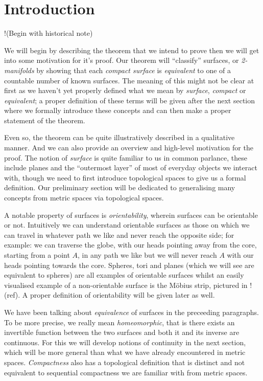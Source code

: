 \section{Introduction}
\label{sec:intro}

!(Begin with historical note)

We will begin by describing the theorem that we intend to prove then
we will get into some motivation for it's proof. Our theorem will
``classify'' surfaces, or \emph{2-manifolds} by showing that each
\emph{compact surface} is \emph{equivalent} to one of a countable
number of known surfaces. The meaning of this might not be clear at
first as we haven't yet properly defined what we mean by
\emph{surface}, \emph{compact} or \emph{equivalent}; a proper
definition of these terms will be given after the next section where we
formally introduce these concepts and can then make a proper statement
of the theorem. 

Even so, the theorem can be quite illustratively described in a
qualitative manner. And we can also provide an overview and high-level
motivation for the proof. The notion of \emph{surface} is quite
familiar to us in common parlance, these include planes and the
``outermost layer'' of most of everyday objects we interact with,
though we need to first introduce topological spaces to give us a
formal definition. Our preliminary section will be dedicated to
generalising many concepts from metric spaces via topological spaces.

A notable property of surfaces is
\emph{orientability}, wherein surfaces can be orientable or
not. Intuitively we can understand orientable surfaces as those on
which we can travel in whatever path we like and never reach the
opposite side; for example: we can traverse the globe, with our heads
pointing away from the core, starting from a point $A$, in any path we
like but we will never reach $A$ with our heads pointing towards the
core. Spheres, tori and planes (which we will see are equivalent to
spheres) are all examples of orientable surfaces whilst an easily
visualised example of a non-orientable surface is the M\"obius strip,
pictured in !(ref). A proper definition of orientability will be given
later as well.

We have been talking about \emph{equivalence} of surfaces in the
preceeding paragraphs. To be more precise, we really mean
\emph{homeomorphic}, that is there exists an invertible function
between the two surfaces and both it and its inverse are
continuous. For this we will develop notions of continuity in the next
section, which will be more general than what we have already
encountered in metric spaces. \emph{Compactness} also has a topological
definition that is distinct and not equivalent to sequential
compactness we are familiar with from metric spaces.

